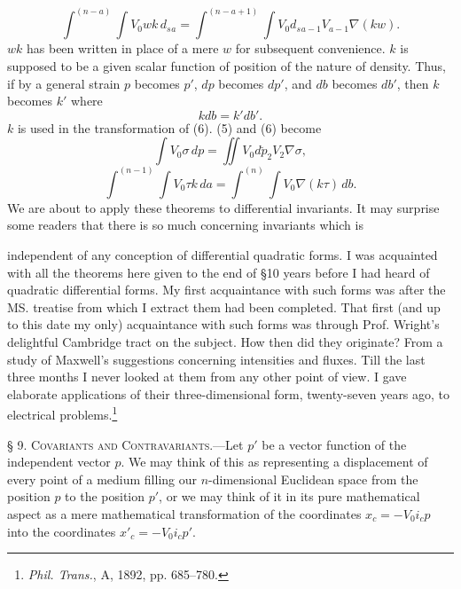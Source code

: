\documentclass[11pt]{article}
\begin{document}
\begin{equation}\int^{(n-a)}\!\int V_0wk\,d_s{}_a=\int^{(n-a+1)}\!\int V_0d_s{}_{a-1}V_{a-1}\nabla(kw).\tag{8}\end{equation}
$wk$ has been written in place of a mere $w$ for subsequent convenience. $k$ is supposed to be a given scalar function of position of the nature of density. Thus, if by a general strain $p$ becomes $p'$, $dp$ becomes $dp'$, and $db$ becomes $db'$, then $k$ becomes $k'$ where
\begin{equation}kdb=k'db'.\tag{9}\end{equation}
$k$ is used in the transformation of (6). (5) and (6) become
\begin{equation}\int V_0\sigma\,dp=\iint V_0d\breve p_2V_2\nabla\sigma,\tag{10}\end{equation}
\begin{equation}\int^{(n-1)}\!\int V_0\tau k\,da=\int^{(n)}\!\int V_0\nabla(k\tau)\,db.\tag{11}\end{equation}
We are about to apply these theorems to differential invariants. It may surprise some readers that there is so much concerning invariants which is
\endgroup

independent of any conception of differential quadratic forms. I was acquainted with all the theorems here given to the end of §10 years before I had heard of quadratic differential forms. My first acquaintance with such forms was after the MS. treatise from which I extract them had been completed. That first (and up to this date my only) acquaintance with such forms was through Prof. Wright's delightful Cambridge tract on the subject. How then did they originate? From a study of Maxwell's suggestions concerning intensities and fluxes. Till the last three months I never looked at them from any other point of view. I gave elaborate applications of their three-dimensional form, twenty-seven years ago, to electrical problems.\footnote{\emph{Phil. Trans.}, A, 1892, pp. 685--780.}

\noindent\textsc{§ 9. Covariants and Contravariants.}---Let $p'$ be a vector function of the independent vector $p$. We may think of this as representing a displacement of every point of a medium filling our $n$-dimensional Euclidean space from the position $p$ to the position $p'$, or we may think of it in its pure mathematical aspect as a mere mathematical transformation of the coordinates $x_c=-V_0i_cp$ into the coordinates $x'_c=-V_0i_cp'$.
\end{document}
